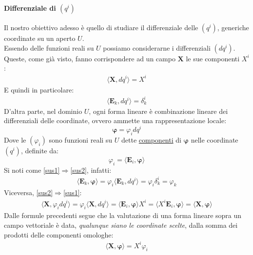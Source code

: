 \paragraph{Differenziale di $(q^i)$} Il nostro obiettivo adesso è quello di studiare il differenziale delle $(q^i)$, generiche coordinate su un aperto $U$.\\
Essendo delle funzioni reali su $U$ possiamo considerarne i differenziali $(dq^i)$. Queste, come già visto, fanno corrispondere ad un campo $\mathbf{X}$ le sue componenti $X^i$:
\begin{align*}
    \langle\mathbf{X},dq^i\rangle=X^i
\end{align*}
E quindi in particolare:
\begin{align*}
    \langle \mathbf{E}_k,dq^i\rangle=\delta_k^i
\end{align*}
D'altra parte, nel dominio $U$, ogni forma lineare è combinazione lineare dei differenziali delle coordinate, ovvero ammette una rappresentazione locale:
\begin{equation}
    \label{sus1}
    \mathbf{\varphi}=\varphi_idq^i
\end{equation}
Dove le $(\varphi_i)$ sono funzioni reali su $U$ dette \underline{componenti} di $\mathbf{\varphi}$ nelle coordinate $(q^i)$, definite da:
\begin{equation}
    \label{sus2}
    \varphi_i=\langle\mathbf{E}_i,\mathbf{\varphi}\rangle
\end{equation}
Si noti come \ref{sus1}$\Rightarrow$\ref{sus2}, infatti:
\begin{align*}
    \langle \mathbf{E}_k,\mathbf{\varphi}\rangle = \varphi_i\langle \mathbf{E}_k,dq^i\rangle = \varphi_i \delta_k^i=\varphi_k
\end{align*}
Viceversa, \ref{sus2}$\Rightarrow$\ref{sus1}:
\begin{align*}
    \langle \mathbf{X},\varphi_idq^i\rangle=\varphi_i \langle \mathbf{X},dq^i\rangle= \langle \mathbf{E}_i, \mathbf{\varphi}\rangle X^i=\langle X^i\mathbf{E}_i, \mathbf{\varphi}\rangle =\langle \mathbf{X}, \mathbf{\varphi}\rangle
\end{align*}
Dalle formule precedenti segue che la valutazione di una forma lineare sopra un campo vettoriale è data, \textit{qualunque siano le coordinate scelte}, dalla somma dei prodotti delle componenti omologhe:
\begin{align*}
    \boxed{\langle \mathbf{X},\mathbf{\varphi}\rangle = X^i\varphi_i}
\end{align*}
